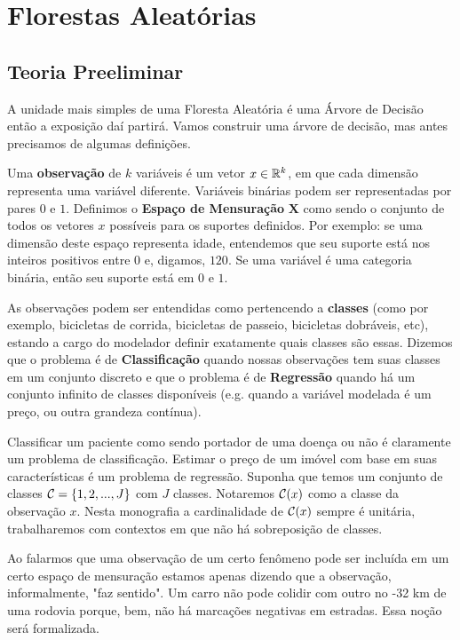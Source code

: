 
\chapter{Florestas Aleatórias}

\section{Teoria Preeliminar}

A unidade mais simples de uma Floresta Aleatória é uma Árvore de Decisão \cite{breiman2017classification} então a exposição daí partirá. Vamos construir uma árvore de decisão, mas antes precisamos de algumas definições. 

Uma \textbf{observação} de $k$ variáveis é um vetor $x \in \mathbb{R}^k$, em que cada dimensão representa uma variável diferente. Variáveis binárias podem ser representadas por pares $0$ e $1$. Definimos o \textbf{Espaço de Mensuração} $\mathbf{X}$ como sendo o conjunto de todos os vetores $x$ possíveis para os suportes definidos. Por exemplo: se uma dimensão deste espaço representa idade, entendemos que seu suporte está nos inteiros positivos entre $0$ e, digamos, $120$. Se uma variável é uma categoria binária, então seu suporte está em $0$ e $1$. 

As observações podem ser entendidas como pertencendo a \textbf{classes} (como por exemplo, bicicletas de corrida, bicicletas de passeio, bicicletas dobráveis, etc), estando a cargo do modelador definir exatamente quais classes são essas. Dizemos que o problema é de \textbf{Classificação} quando nossas observações tem suas classes em um conjunto discreto e que o problema é de \textbf{Regressão} quando há um conjunto infinito de classes disponíveis (e.g. quando a variável modelada é um preço, ou outra grandeza contínua).

Classificar um paciente como sendo portador de uma doença ou não é claramente um problema de classificação. Estimar o preço de um imóvel com base em suas características é um problema de regressão. Suponha que temos um conjunto de classes $\mathcal{C} = \{1,2,...,J\}$ com $J$ classes. Notaremos $\mathcal{C}(x)$ como a classe da observação $x$. Nesta monografia a cardinalidade de $\mathcal{C}(x)$ sempre é unitária, trabalharemos com contextos em que não há sobreposição de classes. 

Ao falarmos que uma observação de um certo fenômeno pode ser incluída em um certo espaço de mensuração estamos apenas dizendo que a observação, informalmente, "faz sentido". Um carro não pode colidir com outro no -32 km de uma rodovia porque, bem, não há marcações negativas em estradas. Essa noção será formalizada.


